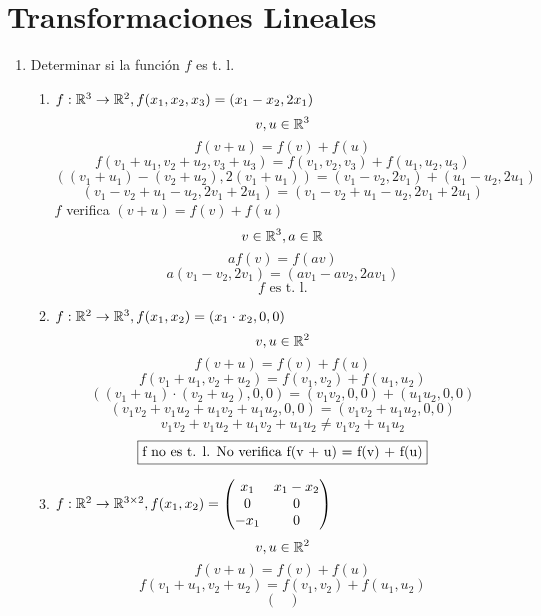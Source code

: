 \documentclass[../practica.root.tex]{subfiles}
\begin{document}
\section{Transformaciones Lineales}

\begin{enumerate}
    \item Determinar si la función $f$ es t. l.
          \begin{enumerate}
              \item $ f: \mathbb{R}^3 \to \mathbb{R}^2, f(x_1, x_2, x_3) = (x_1 - x_2, 2x_1) $
                    \[ v, u \in \mathbb{R}^3 \]
                    \[ f(v + u) = f(v) + f(u) \]
                    \[ f(v_1 + u_1,v_2 + u_2,v_3 + u_3) = f(v_1,v_2,v_3) + f(u_1,u_2,u_3) \]
                    \[ ((v_1 + u_1) - (v_2 + u_2), 2(v_1 + u_1)) = (v_1 - v_2, 2v_1) + (u_1 - u_2, 2u_1) \]
                    \[ (v_1 - v_2 + u_1 - u_2, 2v_1 + 2u_1) = (v_1 - v_2 + u_1 - u_2, 2v_1 + 2u_1) \]
                    $f$ verifica $(v + u) = f(v) + f(u)$
                    \[ v \in \mathbb{R}^3, a \in \mathbb{R} \]
                    \[ af(v) = f(av) \]
                    \[ a(v_1 - v_2, 2v_1) = (av_1 - av_2, 2av_1) \]
                    \[ \boxed{f \text{ es t. l.}} \]
              \item $ f: \mathbb{R}^2 \to \mathbb{R}^3, f(x_1,x_2) = (x_1\cdot x_2,0,0) $
                    \[ v, u \in \mathbb{R}^2 \]
                    \[ f(v + u) = f(v) + f(u) \]
                    \[ f(v_1 + u_1, v_2 + u_2) = f(v_1, v_2) + f(u_1, u_2) \]
                    \[ ((v_1 + u_1)\cdot(v_2 + u_2),0,0) = (v_1v_2,0,0) + (u_1u_2,0,0) \]
                    \[ (v_1v_2 + v_1u_2 + u_1v_2 + u_1u_2,0,0) = (v_1v_2 + u_1u_2,0,0) \]
                    \[ v_1v_2 + v_1u_2 + u_1v_2 + u_1u_2 \neq v_1v_2 + u_1u_2 \]
                    \[ \boxed{$f$ \text{ no es t. l. No verifica } $f(v + u) = f(v) + f(u)$} \]
              \item $ f: \mathbb{R}^2 \to \mathbb{R}^{3\times2}, f(x_1,x_2) =
                    \begin{pmatrix}
                        x_1  & x_1 - x_2 \\
                        0    & 0         \\
                        -x_1 & 0
                    \end{pmatrix}
                    $
                    \[ v, u \in \mathbb{R}^2 \]
                    \[ f(v + u) = f(v) + f(u) \]
                    \[ f(v_1 + u_1, v_2 + u_2) = f(v_1, v_2) + f(u_1, u_2) \]
                    \[
                        \begin{pmatrix}

\end{pmatrix}\]
\end{enumerate}
\end{enumerate}
\end{document}
